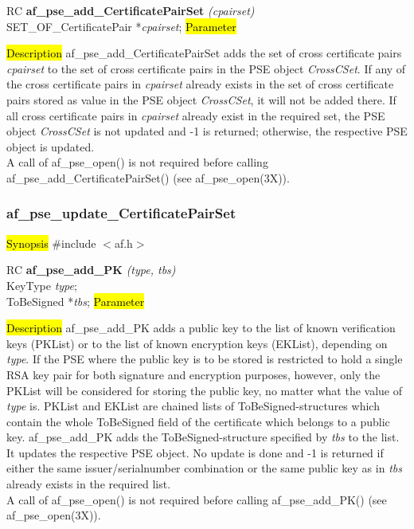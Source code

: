 RC {\bf af\_pse\_add\_CertificatePairSet} {\em (cpairset)} \\
SET\_OF\_CertificatePair *{\em cpairset};
\hl{Parameter}

\hl{Description}
af\_pse\_add\_CertificatePairSet adds the set of cross certificate pairs {\em cpairset}
to the set of cross certificate pairs in the PSE object {\em CrossCSet}. 
If any of the cross certificate pairs in {\em cpairset} already exists in the set of cross
certificate pairs stored as value in the PSE object {\em CrossCSet}, it will not be added there.
If all cross certificate pairs in {\em cpairset} already exist in the required set,
the PSE object {\em CrossCSet} is not updated and -1 is returned; otherwise, the respective 
PSE object is updated. 
\\ [1em]
A call of af\_pse\_open() is not required before calling af\_pse\_add\_CertificatePairSet()
(see af\_pse\_open(3X)).

\subsubsection{af\_pse\_update\_CertificatePairSet}
\label{af_add_PK}
\hl{Synopsis}
\#include $<$af.h$>$

RC {\bf af\_pse\_add\_PK} {\em (type, tbs)} \\
KeyType {\em type}; \\
ToBeSigned *{\em tbs};
\hl{Parameter}


\hl{Description}
af\_pse\_add\_PK adds a public key to the list of known 
verification keys (PKList) or to the list of known encryption keys (EKList), depending
on {\em type}.
If the PSE where the public key is to be stored is restricted to hold a single RSA key pair
for both signature and encryption purposes, however, only the PKList will be considered for storing the public key,
no matter what the value of {\em type} is.
PKList and EKList are chained lists of ToBeSigned-structures which contain the
whole ToBeSigned field of the certificate which belongs to a public key.
af\_pse\_add\_PK adds the ToBeSigned-structure specified by {\em tbs} to the list.
It updates the respective PSE object. No update is done and -1 is returned if
either the same issuer/serialnumber combination or the same public key as in {\em tbs}
already exists in the required list.
\\ [1em]
A call of af\_pse\_open() is not required before calling af\_pse\_add\_PK()
(see af\_pse\_open(3X)).


